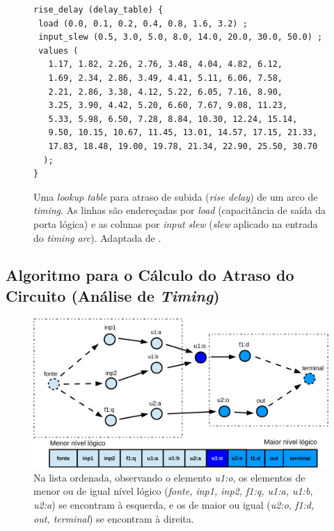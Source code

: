 \documentclass[
	12pt,				%
	openright,			%
	twoside,			%
	a4paper,			%
	english,			%
	french,				%
	spanish,			%
	brazil,				%
	]{abntex2}
\begin{document}
\begin{figure}[ht]
\lstset{basicstyle=\footnotesize}
\begin{lstlisting}[frame=single]
rise_delay (delay_table) {
 load (0.0, 0.1, 0.2, 0.4, 0.8, 1.6, 3.2) ;
 input_slew (0.5, 3.0, 5.0, 8.0, 14.0, 20.0, 30.0, 50.0) ;
 values (
   1.17, 1.82, 2.26, 2.76, 3.48, 4.04, 4.82, 6.12,
   1.69, 2.34, 2.86, 3.49, 4.41, 5.11, 6.06, 7.58,
   2.21, 2.86, 3.38, 4.12, 5.22, 6.05, 7.16, 8.90,
   3.25, 3.90, 4.42, 5.20, 6.60, 7.67, 9.08, 11.23,
   5.33, 5.98, 6.50, 7.28, 8.84, 10.30, 12.24, 15.14,
   9.50, 10.15, 10.67, 11.45, 13.01, 14.57, 17.15, 21.33,
   17.83, 18.48, 19.00, 19.78, 21.34, 22.90, 25.50, 30.70
  );
}
\end{lstlisting}
\caption{Uma \textit{lookup table} para atraso de subida (\textit{rise delay}) de um arco de \textit{timing}. As linhas são endereçadas por \textit{load} (capacitância de saída da porta lógica) e as colunas por \textit{input slew} (\textit{slew} aplicado na entrada do \textit{timing arc}). Adaptada de \cite{Contest2013}.}
\label{fig:lookup_table}
\end{figure}



\subsection{Algoritmo para o Cálculo do Atraso do Circuito (Análise de \textit{Timing})}

\begin{figure}[ht]
\begin{center}
\includegraphics[width=\linewidth]{img/grafo_lista_nivel_logico.pdf} 
\caption{Na lista ordenada, observando o elemento \textit{u1:o}, os elementos de menor ou de igual  nível lógico (\textit{fonte, inp1, inp2, f1:q, u1:a, u1:b, u2:a}) se encontram à esquerda, e os de maior ou igual (\textit{u2:o, f1:d, out, terminal}) se encontram à direita.}
\label{fig:grafo_lista_nivel_logico}
\end{center}
\end{figure}
\end{document}
